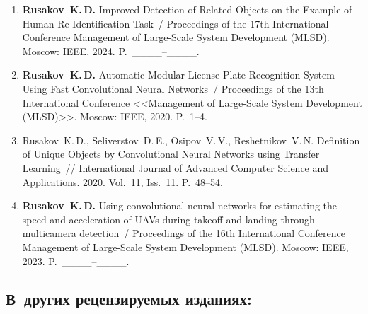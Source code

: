 \begin{enumerate}[resume]
    \item \textbf{Rusakov~K.\,D.} Improved Detection of Related Objects on the
          Example of Human Re‑Identification Task~/ Proceedings of the 17th
          International Conference Management of Large‑Scale System Development
          (MLSD). Moscow: IEEE, 2024. P.~\_\_\_\_--\_\_\_\_.
    \item \textbf{Rusakov~K.\,D.} Automatic Modular License Plate Recognition
          System Using Fast Convolutional Neural Networks~/ Proceedings of the
          13th International Conference <<Management of Large‑Scale System
          Development (MLSD)>>. Moscow: IEEE, 2020. P.~1--4.
    \item Rusakov~K.\,D., Seliverstov~D.\,E., Osipov~V.\,V., Reshetnikov~V.\,N.
          Definition of Unique Objects by Convolutional Neural Networks using
          Transfer Learning~// International Journal of Advanced Computer
          Science and Applications. 2020. Vol.~11, Iss.~11. P.~48--54.
    \item \textbf{Rusakov~K.\,D.} Using convolutional neural networks for
          estimating the speed and acceleration of UAVs during takeoff and
          landing through multicamera detection~/ Proceedings of the 16th
          International Conference Management of Large‑Scale System Development
          (MLSD). Moscow: IEEE, 2023. P.~\_\_\_\_--\_\_\_\_.
\end{enumerate}

\subsection*{В~других рецензируемых изданиях:}

